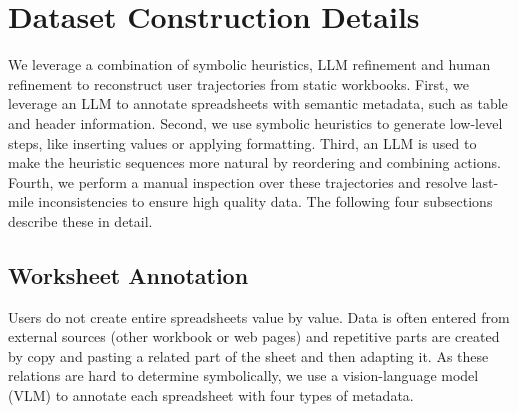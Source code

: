 \documentclass{article}
\theoremstyle{plain}
\theoremstyle{definition}
\theoremstyle{remark}
\begin{document}



\newpage
\appendix
\onecolumn

\section{Dataset Construction Details}\label{app:dataset-details}
We leverage a combination of symbolic heuristics, LLM refinement and human refinement to reconstruct user trajectories from static workbooks.
First, we leverage an LLM to annotate spreadsheets with semantic metadata, such as table and header information.
Second, we use symbolic heuristics to generate low-level steps, like inserting values or applying formatting.
Third, an LLM is used to make the heuristic sequences more natural by reordering and combining actions.
Fourth, we perform a manual inspection over these trajectories and resolve last-mile inconsistencies to ensure high quality data.
The following four subsections describe these in detail. 

\subsection{Worksheet Annotation}

Users do not create entire spreadsheets value by value.
Data is often entered from external sources (other workbook or web pages) and repetitive parts are created by copy and pasting a related part of the sheet and then adapting it.
As these relations are hard to determine symbolically, we use a vision-language model (VLM) to annotate each spreadsheet with four types of metadata.
\end{document}
